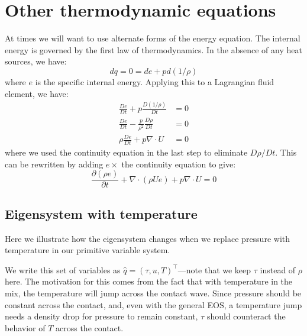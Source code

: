 \section{Other thermodynamic equations}

At times we will want to use alternate forms of the energy equation.  The
internal energy is governed by the first law of thermodynamics.  In the
absence of any heat sources, we have:
\begin{equation}
dq = 0 = de + pd(1/\rho)
\end{equation}
where $e$ is the specific internal energy.
Applying this to a Lagrangian fluid element, we have:
\begin{align}
\frac{De}{Dt} + p \frac{D(1/\rho)}{Dt} &= 0 \\
\frac{De}{Dt} - \frac{p}{\rho^2} \frac{D\rho}{Dt} &= 0 \\
\rho \frac{De}{Dt} + p \nabla \cdot U &= 0
\end{align}
where we used the continuity equation in the last step to eliminate
$D\rho/Dt$.  This can be rewritten by adding $e \times$ the continuity
equation to give:
\begin{equation}
\frac{\partial (\rho e)}{\partial t} + \nabla \cdot (\rho U e) + p \nabla \cdot U = 0 \label{eq:euler:econs}
\end{equation}


\subsection{Eigensystem with temperature}

Here we illustrate how the eigensystem changes when we replace pressure with
temperature in our primitive variable system.

We write this set of variables as $\hat{q} = (\tau, u,
T)^\intercal$---note that we keep $\tau$ instead of $\rho$ here.  The
motivation for this comes from the fact that with temperature in the
mix, the temperature will jump across the contact wave.  Since
pressure should be constant across the contact, and, even with the
general EOS, a temperature jump needs a density drop for pressure to
remain constant, $\tau$ should counteract the behavior of $T$ across
the contact.

